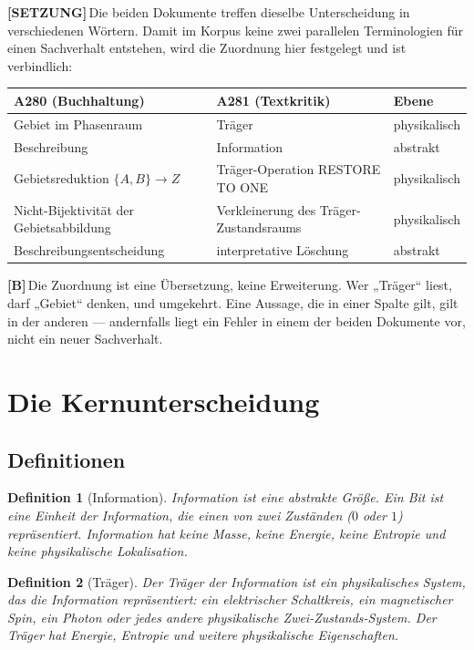 \documentclass[11pt,a4paper]{article}
\newcommand{\LS}{\textcolor{laySet}{\textbf{\footnotesize\textsf{[SETZUNG]}}}\,}
\newcommand{\LB}{\textcolor{layB}{\textbf{\footnotesize\textsf{[B]}}}\,}
\theoremstyle{ffgft}
\newtheorem{definition}{Definition}
\begin{document}
\LS Die beiden Dokumente treffen dieselbe Unterscheidung in verschiedenen Wörtern.
Damit im Korpus keine zwei parallelen Terminologien für einen Sachverhalt
entstehen, wird die Zuordnung hier festgelegt und ist verbindlich:

\begin{center}
\small
\begin{tabular}{@{}p{}p{}p{}@{}}
\toprule
\textbf{A280 (Buchhaltung)} & \textbf{A281 (Textkritik)} & \textbf{Ebene} \\
\midrule
Gebiet im Phasenraum & Träger & physikalisch \\
Beschreibung & Information & abstrakt \\
Gebietsreduktion $\{A,B\}\to Z$ & Träger-Operation \textup{RESTORE TO ONE} & physikalisch \\
Nicht-Bijektivität der Gebietsabbildung & Verkleinerung des Träger-Zustandsraums & physikalisch \\
Beschreibungsentscheidung & interpretative Löschung & abstrakt \\
\bottomrule
\end{tabular}
\end{center}

\LB Die Zuordnung ist eine Übersetzung, keine Erweiterung. Wer „Träger“ liest,
darf „Gebiet“ denken, und umgekehrt. Eine Aussage, die in einer Spalte gilt, gilt
in der anderen --- andernfalls liegt ein Fehler in einem der beiden Dokumente vor,
nicht ein neuer Sachverhalt.

\section{Die Kernunterscheidung}

\subsection{Definitionen}

\begin{definition}[Information]
Information ist eine abstrakte Größe. Ein Bit ist eine Einheit der Information,
die einen von zwei Zuständen ($0$ oder $1$) repräsentiert. Information hat keine
Masse, keine Energie, keine Entropie und keine physikalische Lokalisation.
\end{definition}

\begin{definition}[Träger]
Der Träger der Information ist ein physikalisches System, das die Information
repräsentiert: ein elektrischer Schaltkreis, ein magnetischer Spin, ein Photon
oder jedes andere physikalische Zwei-Zustands-System. Der Träger hat Energie,
Entropie und weitere physikalische Eigenschaften.
\end{definition}
\end{document}
